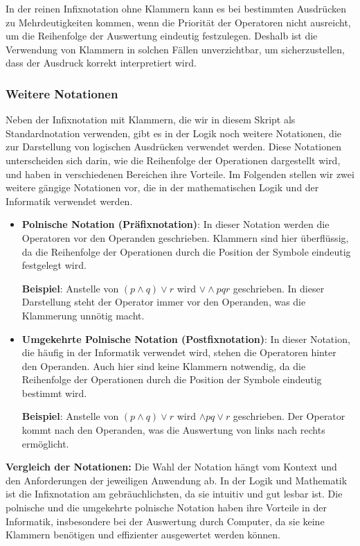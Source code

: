 \documentclass[main.tex]{subfiles}
\begin{document}
\begin{remark}
In der reinen Infixnotation ohne Klammern kann es bei bestimmten Ausdrücken zu Mehrdeutigkeiten kommen, wenn die Priorität der Operatoren nicht ausreicht, um die Reihenfolge der Auswertung eindeutig festzulegen. Deshalb ist die Verwendung von Klammern in solchen Fällen unverzichtbar, um sicherzustellen, dass der Ausdruck korrekt interpretiert wird.
\end{remark}

\subsubsection{Weitere Notationen}

Neben der Infixnotation mit Klammern, die wir in diesem Skript als Standardnotation verwenden, gibt es in der Logik noch weitere Notationen, die zur Darstellung von logischen Ausdrücken verwendet werden. Diese Notationen unterscheiden sich darin, wie die Reihenfolge der Operationen dargestellt wird, und haben in verschiedenen Bereichen ihre Vorteile. Im Folgenden stellen wir zwei weitere gängige Notationen vor, die in der mathematischen Logik und der Informatik verwendet werden.

\begin{itemize}
    \item \textbf{Polnische Notation (Präfixnotation)}: In dieser Notation werden die Operatoren vor den Operanden geschrieben. Klammern sind hier überflüssig, da die Reihenfolge der Operationen durch die Position der Symbole eindeutig festgelegt wird.
    
    \textbf{Beispiel}: Anstelle von \((p \land q) \lor r\) wird \(\lor \land p q r\) geschrieben. In dieser Darstellung steht der Operator immer vor den Operanden, was die Klammerung unnötig macht.
    
    \item \textbf{Umgekehrte Polnische Notation (Postfixnotation)}: In dieser Notation, die häufig in der Informatik verwendet wird, stehen die Operatoren hinter den Operanden. Auch hier sind keine Klammern notwendig, da die Reihenfolge der Operationen durch die Position der Symbole eindeutig bestimmt wird.
    
    \textbf{Beispiel}: Anstelle von \((p \land q) \lor r\) wird \(\land p q \lor r\) geschrieben. Der Operator kommt nach den Operanden, was die Auswertung von links nach rechts ermöglicht.
\end{itemize}

\textbf{Vergleich der Notationen:} 
Die Wahl der Notation hängt vom Kontext und den Anforderungen der jeweiligen Anwendung ab. In der Logik und Mathematik ist die Infixnotation am gebräuchlichsten, da sie intuitiv und gut lesbar ist. Die polnische und die umgekehrte polnische Notation haben ihre Vorteile in der Informatik, insbesondere bei der Auswertung durch Computer, da sie keine Klammern benötigen und effizienter ausgewertet werden können.
\end{document}

